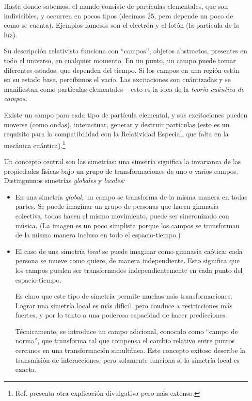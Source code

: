 Hasta donde sabemos, el mundo consiste de part\'iculas elementales, que
son indivisibles, y occurren en pocos tipos (decimos 25, pero depende
un poco de como se cuenta). Ejemplos famosos son el electr\'on y el
fot\'on (la part\'icula de la luz).

Su descripci\'on relativista funciona con ``campos'', objetos
abstractos, presentes en todo el universo, en cualquier momento.
En un punto, un campo puede tomar diferentes estados, que dependen
del tiempo. Si los campos en una regi\'on est\'an en su estado base,
percibimos el vac\'io. Las excitaciones son cu\'antizadas y se
manifiestan como part\'iculas elementales -- esto es la idea de la
{\it teor\'ia cu\'antica de campos.}

Existe un campo para cada tipo de part\'icula elemental,
y sus excitaciones pueden moverse (como ondas), interactuar,
generar y destruir part\'iculas (esto es un requisito para
la compatibilidad con la Relatividad Especial, que falta en
la mec\'anica cu\'antica).\footnote{Ref. \cite{WBparti} presenta
  otra explicaci\'on divulgativa pero m\'as extensa.}

Un concepto central son las simetr\'ias: una simetr\'ia significa
la invarianza de las propiedades f\'isicas bajo un grupo de
transformaciones de uno o varios campos. Distinguimos simetr\'ias
{\em globales} y {\em locales:}

\begin{itemize}

\item En una simetr\'ia {\em global,} un campo se transforma de la
  misma manera en todas partes. Se puede imaginar un grupo de personas
  que hacen gimnasia colectiva, todas hacen el mismo movimiento,
  puede ser sincronizado con m\'usica.
  (La imagen es un poco simplista porque los campos se transforman
  de la misma manera incluso en todo el espacio-tiempo.)
  
\item El caso de una simetr\'ia {\em local} se puede imaginar como
  gimnasia ca\'otica: cada persona se mueve como quiere, de manera
  independiente. Esto significa que los campos pueden ser transformados
  independientemente en cada punto del espacio-tiempo.

  Es claro que este tipo de simetr\'ia permite muchas m\'as
  transformaciones.
  Lograr una simetr\'ia local es m\'as dif\'icil, pero conduce
  a restricciones m\'as fuertes, y por lo tanto a una poderosa
  capacidad de hacer predicciones.
  
  T\'ecnicamente, se introduce un campo adicional, conocido como
  ``campo de norma'', que transforma tal que compensa el cambio
  relativo entre puntos cercanos en una transformaci\'on simult\'anea.
  Este concepto exitoso describe la transmisi\'on de interacciones,
  pero solamente funciona si la simetr\'ia local es exacta.
  
\end{itemize}

